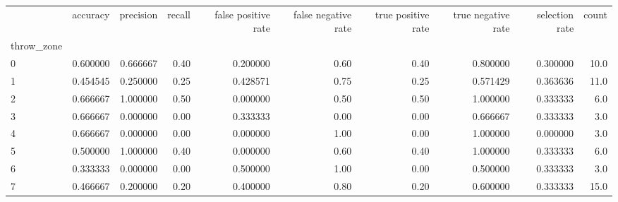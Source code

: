 \begin{tabular}{lrrrrrrrrr}
\toprule
{} &  accuracy &  precision &  recall &  false positive rate &  false negative rate &  true positive rate &  true negative rate &  selection rate &  count \\
throw\_zone &           &            &         &                      &                      &                     &                     &                 &        \\
\midrule
0          &  0.600000 &   0.666667 &    0.40 &             0.200000 &                 0.60 &                0.40 &            0.800000 &        0.300000 &   10.0 \\
1          &  0.454545 &   0.250000 &    0.25 &             0.428571 &                 0.75 &                0.25 &            0.571429 &        0.363636 &   11.0 \\
2          &  0.666667 &   1.000000 &    0.50 &             0.000000 &                 0.50 &                0.50 &            1.000000 &        0.333333 &    6.0 \\
3          &  0.666667 &   0.000000 &    0.00 &             0.333333 &                 0.00 &                0.00 &            0.666667 &        0.333333 &    3.0 \\
4          &  0.666667 &   0.000000 &    0.00 &             0.000000 &                 1.00 &                0.00 &            1.000000 &        0.000000 &    3.0 \\
5          &  0.500000 &   1.000000 &    0.40 &             0.000000 &                 0.60 &                0.40 &            1.000000 &        0.333333 &    6.0 \\
6          &  0.333333 &   0.000000 &    0.00 &             0.500000 &                 1.00 &                0.00 &            0.500000 &        0.333333 &    3.0 \\
7          &  0.466667 &   0.200000 &    0.20 &             0.400000 &                 0.80 &                0.20 &            0.600000 &        0.333333 &   15.0 \\
\bottomrule
\end{tabular}

